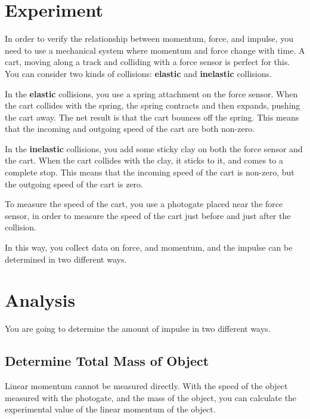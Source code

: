 \section{Experiment}
In order to verify the relationship between momentum, force, and impulse, you need to use a mechanical system where momentum and force change with time. A cart, moving along a track and colliding with a force sensor is perfect for this. You can consider two kinds of collisions: \textbf{elastic} and \textbf{inelastic} collisions.

In the \textbf{elastic} collisions, you use a spring attachment on the force sensor. When the cart collides with the spring, the spring contracts and then expands, pushing the cart away. The net result is that the cart bounces off the spring. This means that the incoming and outgoing speed of the cart are both non-zero.

In the \textbf{inelastic} collisions, you add some sticky clay on both the force sensor and the cart. When the cart collides with the clay, it sticks to it, and comes to a complete stop. This means that the incoming speed of the cart is non-zero, but the outgoing speed of the cart is zero.

To measure the speed of the cart, you use a photogate placed near the force sensor, in order to measure the speed of the cart just before and just after the collision.

In this way, you collect data on force, and momentum, and the impulse can be determined in two different ways.
\section{Analysis}
You are going to determine the amount of impulse in two different ways.
\subsection{Determine Total Mass of Object}
Linear momentum cannot be measured directly. With the speed of the object measured with the photogate, and the mass of the object, you can calculate the experimental value of the linear momentum of the object.

